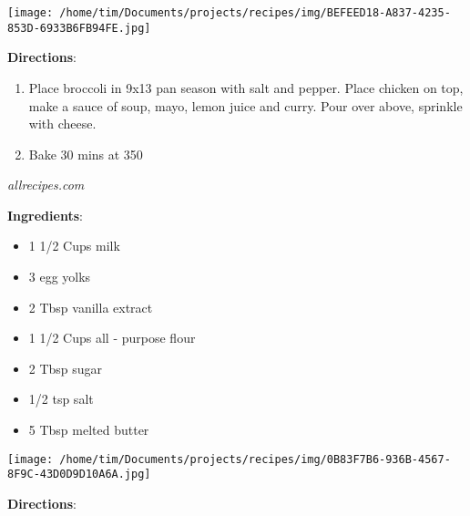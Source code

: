 \documentclass[11pt, twoside, openany]{book}
\begin{document}
\begin{minipage}[t]{0.2\linewidth}
\centering \strut\vspace*{-\baselineskip}\newline
\texttt{[image: /home/tim/Documents/projects/recipes/img/BEFEED18-A837-4235-853D-6933B6FB94FE.jpg]}\\
\end{minipage}\vspace{3mm}
\textbf{Directions}:
\vspace{-3mm}\begin{enumerate}\setlength\itemsep{-1mm}
\item Place broccoli in 9x13 pan season with salt and pepper. Place chicken on top, make a sauce of soup, mayo, lemon juice and curry. Pour over above, sprinkle with cheese.
\item Bake 30 mins at 350
\end{enumerate}
 \label{vanilla-crepes}\hfill\textit{allrecipes.com}\\
\begin{minipage}[t]{0.8\linewidth}
\textbf{Ingredients}:\vspace{-3mm}
\begin{multicols}{2}
\begin{itemize}\setlength\itemsep{-1mm}
\item 1 1/2 Cups milk
\item 3 egg yolks
\item 2 Tbsp vanilla extract
\item 1 1/2 Cups all - purpose flour
\item 2 Tbsp sugar
\item 1/2 tsp salt
\item 5 Tbsp melted butter
\end{itemize}
\end{multicols}
\end{minipage}
\begin{minipage}[t]{0.2\linewidth}
\centering \strut\vspace*{-\baselineskip}\newline
\texttt{[image: /home/tim/Documents/projects/recipes/img/0B83F7B6-936B-4567-8F9C-43D0D9D10A6A.jpg]}\\
\end{minipage}\vspace{3mm}
\textbf{Directions}:
\end{document}
